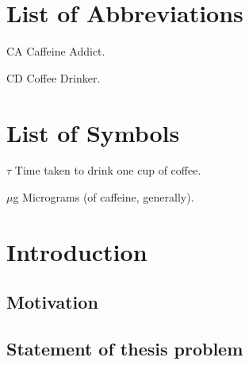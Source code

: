 \documentclass[edeposit,fullpage,draftthesis]{uiucthesis2009}
\begin{document}

\setcounter{tocdepth}{4}

\tableofcontents
\listoftables
\listoffigures

\chapter{List of Abbreviations}

\begin{symbollist*}
\item[CA] Caffeine Addict.
\item[CD] Coffee Drinker.
\end{symbollist*}

\chapter{List of Symbols}

\begin{symbollist}[0.7in]
\item[$\tau$] Time taken to drink one cup of coffee.
\item[$\mu$g] Micrograms (of caffeine, generally).
\end{symbollist}

\mainmatter
\chapter{Introduction}

    \section{Motivation}
    \section{Statement of thesis problem}
\end{document}
